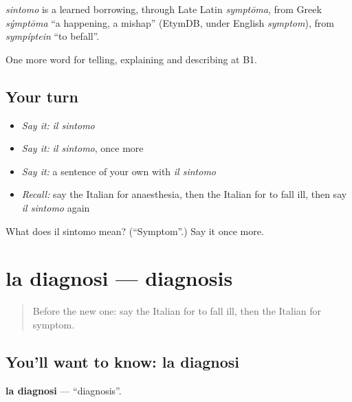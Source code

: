 \begin{cousinweb}
\emph{sintomo} is a learned borrowing, through Late Latin \emph{symptōma}, from Greek \emph{sýmptōma} \textquotedblleft{}a happening, a mishap\textquotedblright{} (EtymDB, under English \emph{symptom}), from \emph{sympíptein} \textquotedblleft{}to befall\textquotedblright{}.
\end{cousinweb}

\begin{grammarlens}[title={What you've built}]
One more word for telling, explaining and describing at B1.
\end{grammarlens}

\subsection*{Your turn}
\begin{itemize}
\raggedright
  \item \emph{Say it:} \emph{il sintomo}
  \item \emph{Say it:} \emph{il sintomo}, once more
  \item \emph{Say it:} a sentence of your own with \emph{il sintomo}
  \item \emph{Recall:} say the Italian for anaesthesia, then the Italian for to fall ill, then say \emph{il sintomo} again
\end{itemize}

\begin{tcolorbox}[breakable,colback=teal!4,colframe=teal!35!black,title={Before you move on}]
What does il sintomo mean? (\textquotedblleft{}Symptom\textquotedblright{}.) Say it once more.
\end{tcolorbox}
\section[la diagnosi]{la diagnosi — diagnosis}

\label{lesson:IT-C489-diagnosi}



\begin{quote}
Before the new one: say the Italian for to fall ill, then the Italian for symptom.
\end{quote}

\subsection*{You'll want to know: la diagnosi}
\textbf{la diagnosi} — \textquotedblleft{}diagnosis\textquotedblright{}.

